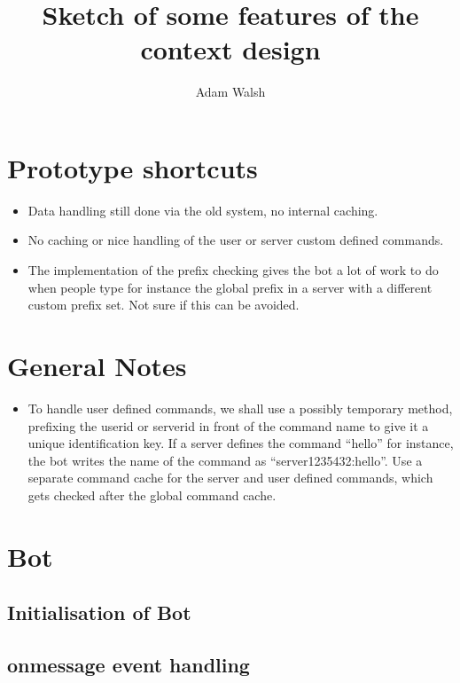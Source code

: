 \documentclass[a4paper]{amsart}
\title{Sketch of some features of the context design}
\author{Adam Walsh}
\begin{document}
\maketitle

\section{Prototype shortcuts}
\begin{itemize}
    \item Data handling still done via the old system, no internal caching.
    \item No caching or nice handling of the user or server custom defined commands.
    \item The implementation of the prefix checking gives the bot a lot of work to do when people type for instance the global prefix in a server with a different custom prefix set. Not sure if this can be avoided.
\end{itemize}


\section{General Notes}
\begin{itemize}
    \item To handle user defined commands, we shall use a possibly temporary method, prefixing the userid or serverid in front of the command name to give it a unique identification key. If a server defines the command ``hello'' for instance, the bot writes the name of the command as ``server1235432:hello''. Use a separate command cache for the server and user defined commands, which gets checked after the global command cache.
\end{itemize}



\section{Bot}

\subsection{Initialisation of Bot}
\subsection{onmessage event handling}
\end{document}
